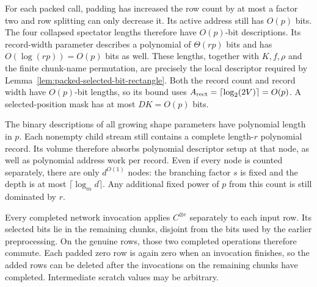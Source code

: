 \documentclass[11pt]{article}
\theoremstyle{definition}
\begin{document}
For each packed call, padding has increased the row count by at most
a factor two and row splitting can only decrease it.  Its active
address still has \(O(p)\) bits. The four collapsed spectator lengths
therefore have \(O(p)\)-bit descriptions. Its record-width parameter
describes a polynomial of \(\Theta(rp)\) bits and has
\(O(\log(rp))=O(p)\) bits as well. These lengths, together with
\(K,f,\rho\) and the finite chunk-name permutation, are precisely the
local descriptor required by
Lemma~\ref{lem:packed-selected-bit-rectangle}. Both the record count
and record width have \(O(p)\)-bit lengths, so its bound uses
\(A_{\rm rect}=\lceil\log_2(2V)\rceil=O(p)\). A selected-position
mask has at most \(DK=O(p)\) bits.

The binary descriptions of all growing shape parameters have
polynomial length in \(p\).  Each nonempty child stream still contains
a complete length-\(r\) polynomial record.  Its volume therefore
absorbs polynomial descriptor setup at that node, as well as
polynomial address work per record.  Even if every node is counted
separately, there are only \(d^{O(1)}\) nodes: the branching factor
\(s\) is fixed and the depth is at most
\(\lceil\log_m d\rceil\).  Any additional fixed power of \(p\)
from this count is still dominated by \(r\).

Every completed network invocation applies \(C^{\otimes e}\)
separately to each input row.  Its selected bits lie in the
remaining chunks, disjoint from the bits used by the earlier
preprocessing.  On the genuine rows, those two completed operations
therefore commute.
Each padded zero row is again zero when an invocation finishes, so the
added rows can be deleted after the invocations on the remaining chunks
have completed. Intermediate scratch values may be arbitrary.
\end{document}
